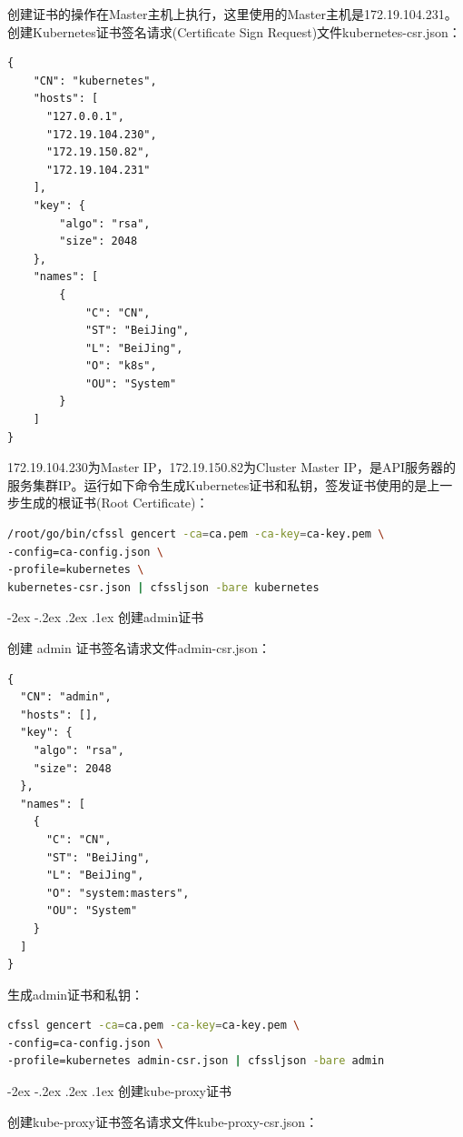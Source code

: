 \documentclass[8pt]{book}
\makeatletter
\numberwithin{dummy}{section}
\theoremstyle{ocrenumbox}
\theoremstyle{blacknumex}
\theoremstyle{blacknumbox}
\theoremstyle{ocrenum}
\renewcommand\paragraph{\@startsection{paragraph}{4}{\z@}
	{-2ex \@plus-.2ex \@minus .2ex}
	{.1ex}
	{\normalfont\small\sffamily\bfseries}}
\makeatother
\begin{document}
创建证书的操作在Master主机上执行，这里使用的Master主机是172.19.104.231。创建Kubernetes证书签名请求(Certificate Sign Request)文件kubernetes-csr.json：

\begin{lstlisting}
{
    "CN": "kubernetes",
    "hosts": [
      "127.0.0.1",
      "172.19.104.230",
      "172.19.150.82",
      "172.19.104.231"
    ],
    "key": {
        "algo": "rsa",
        "size": 2048
    },
    "names": [
        {
            "C": "CN",
            "ST": "BeiJing",
            "L": "BeiJing",
            "O": "k8s",
            "OU": "System"
        }
    ]
}
\end{lstlisting}

172.19.104.230为Master IP，172.19.150.82为Cluster Master IP，是API服务器的服务集群IP。运行如下命令生成Kubernetes证书和私钥，签发证书使用的是上一步生成的根证书(Root Certificate)：

\begin{lstlisting}[language=Bash]
/root/go/bin/cfssl gencert -ca=ca.pem -ca-key=ca-key.pem \
-config=ca-config.json \
-profile=kubernetes \
kubernetes-csr.json | cfssljson -bare kubernetes
\end{lstlisting}

\paragraph{创建admin证书}

创建 admin 证书签名请求文件admin-csr.json：

\begin{lstlisting}
{
  "CN": "admin",
  "hosts": [],
  "key": {
    "algo": "rsa",
    "size": 2048
  },
  "names": [
    {
      "C": "CN",
      "ST": "BeiJing",
      "L": "BeiJing",
      "O": "system:masters",
      "OU": "System"
    }
  ]
}
\end{lstlisting}

生成admin证书和私钥：

\begin{lstlisting}[language=Bash]
cfssl gencert -ca=ca.pem -ca-key=ca-key.pem \
-config=ca-config.json \
-profile=kubernetes admin-csr.json | cfssljson -bare admin
\end{lstlisting}

\paragraph{创建kube-proxy证书}

创建kube-proxy证书签名请求文件kube-proxy-csr.json：
\end{document}
